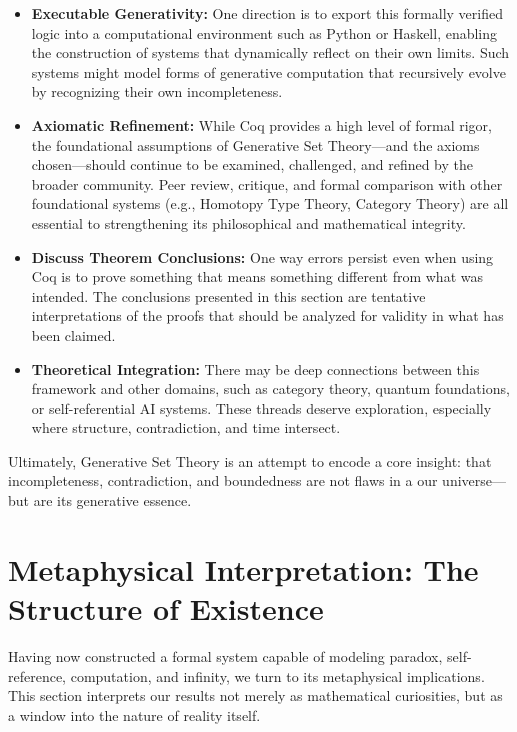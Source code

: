 \documentclass[12pt]{article}
\begin{document}
\begin{itemize}
    \item \textbf{Executable Generativity:} One direction is to export this formally verified logic into a computational environment such as Python or Haskell, enabling the construction of systems that dynamically reflect on their own limits. Such systems might model forms of generative computation that recursively evolve by recognizing their own incompleteness.

    \item \textbf{Axiomatic Refinement:} While Coq provides a high level of formal rigor, the foundational assumptions of Generative Set Theory—and the axioms chosen—should continue to be examined, challenged, and refined by the broader community. Peer review, critique, and formal comparison with other foundational systems (e.g., Homotopy Type Theory, Category Theory) are all essential to strengthening its philosophical and mathematical integrity.

    \item \textbf{Discuss Theorem Conclusions:} One way errors persist even when using Coq is to prove something that means something different from what was intended. The conclusions presented in this section are tentative interpretations of the proofs that should be analyzed for validity in what has been claimed.

    \item \textbf{Theoretical Integration:} There may be deep connections between this framework and other domains, such as category theory, quantum foundations, or self-referential AI systems. These threads deserve exploration, especially where structure, contradiction, and time intersect.
\end{itemize}

Ultimately, Generative Set Theory is an attempt to encode a core insight: that incompleteness, contradiction, and boundedness are not flaws in a our universe—but are its generative essence.

\section{Metaphysical Interpretation: The Structure of Existence}

Having now constructed a formal system capable of modeling paradox, self-reference, computation, and infinity, we turn to its metaphysical implications. This section interprets our results not merely as mathematical curiosities, but as a window into the nature of reality itself.
\end{document}
